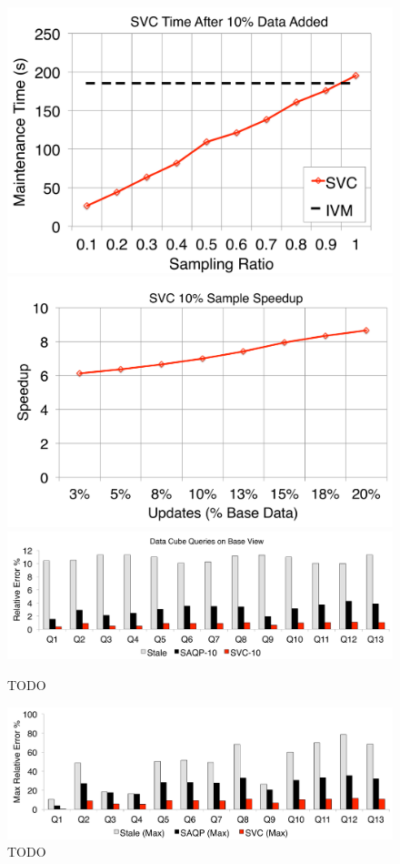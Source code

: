 \begin{figure}[t]
\centering
 \includegraphics[scale=0.14]{exp/msdc_1.pdf}
 \includegraphics[scale=0.14]{exp/msdc_2.pdf}
  \includegraphics[scale=0.16]{exp/msdc_3.pdf}
   \caption{TODO \label{exp2-acc-sample}}
\end{figure}

\begin{figure}[t]
\centering
\includegraphics[scale=0.16]{exp/msdc_4.pdf}
   \caption{TODO \label{exp2-max}}
\end{figure}

